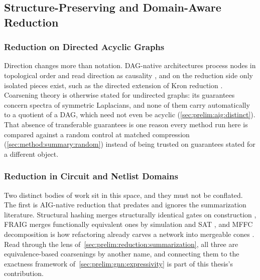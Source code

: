 \subsection{Structure-Preserving and Domain-Aware Reduction}
\label{sec:relwork:domain}

\subsubsection{Reduction on Directed Acyclic Graphs}
\label{sec:relwork:domain:dag}
Direction changes more than notation. DAG-native architectures process nodes in
topological order and read direction as causality \citep{thost2021dagnn,zhang2019dvae},
and on the reduction side only isolated pieces exist, such as the directed extension of
Kron reduction \citep{sugiyama2023kron}. Coarsening theory is otherwise stated for
undirected graphs: its guarantees concern spectra of symmetric Laplacians, and none of
them carry automatically to a quotient of a DAG, which need not even be acyclic
(\ref{sec:prelim:aig:distinct}). That absence of transferable guarantees is one reason
every method run here is compared against a random control at matched compression
(\ref{sec:method:summary:random}) instead of being trusted on guarantees stated for a
different object.

\subsubsection{Reduction in Circuit and Netlist Domains}
\label{sec:relwork:domain:circuits}
Two distinct bodies of work sit in this space, and they must not be conflated. The first
is AIG-native reduction that predates and ignores the summarization literature.
Structural hashing merges structurally identical gates on construction
\citep{kuehlmann2002robust}, FRAIG merges functionally equivalent ones by simulation and
SAT \citep{mishchenko2005fraig}, and MFFC decomposition is how refactoring already carves
a network into mergeable cones \citep{mishchenko2006rewriting}. Read through the lens
of~\ref{sec:prelim:reduction:summarization}, all three are equivalence-based coarsenings
by another name, and connecting them to the exactness framework
of~\ref{sec:prelim:gnn:expressivity} is part of this thesis's contribution.


